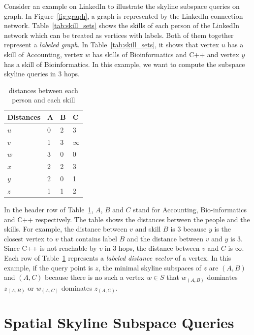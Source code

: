 Consider an example on LinkedIn to illustrate the skyline subspace queries on graph. In Figure~\ref{fig:graph}, a graph is represented by the LinkedIn connection network. Table~\ref{tab:skill_sets} shows the skills of each person of the LinkedIn network which can be treated as vertices with labels. 
Both of them together represent a \emph{labeled graph}. In Table~\ref{tab:skill_sets}, it shows that vertex $u$ has a skill of Accounting, vertex $w$ has skills of Bioinformatics and C++ and vertex $y$ has a skill of Bioinformatics. In this example, we want to compute the subspace skyline queries in $3$ hops.

\begin{table}[h]
    \centering
    \begin{tabular}{llll}
    \hline
        Distances & A & B & C \\ \hline
        $u$       & 0 & 2 & 3 \\ \hline
        $v$       & 1 & 3 & $\infty$ \\ \hline
        $w$       & 3 & 0 & 0 \\ \hline
        $x$       & 2 & 2 & 3 \\ \hline
        $y$       & 2 & 0 & 1 \\ \hline
        $z$       & 1 & 1 & 2 \\ \hline
    \end{tabular}
    \caption{\label{tab:distances_graph} distances between each person and each skill}
    
\end{table}

In the header row of Table~\ref{tab:distances_graph}, $A$, $B$ and $C$ stand for Accounting, Bio-informatics and C++ respectively. The table shows the distances between the people and the skills. For example, the distance between $v$ and skill $B$ is $3$ because $y$ is the closest vertex to $v$ that contains label $B$ and the distance between $v$ and $y$ is $3$. Since C++ is not reachable by $v$ in $3$ hops, the distance between $v$ and $C$ is $\infty$. Each row of Table~\ref{tab:distances_graph} represents a \emph{labeled distance vector} of a vertex.
In this example, if the query point is $z$, the minimal skyline subspaces of $z$ are $(A, B)$ and $(A, C)$ because there is no such a vertex $w \in S$ that $w_{(A,B)}$ dominates $z_{(A,B)}$ or $w_{(A,C)}$ dominates $z_{(A,C)}$.


\section{Spatial Skyline Subspace Queries}

